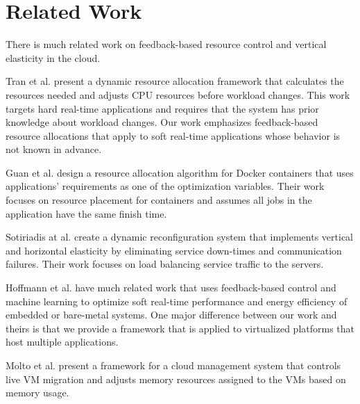 \section{Related Work}
\label{sr}

There is much related work on feedback-based resource control and vertical elasticity in the cloud.

Tran et al. \cite{dartc} present a dynamic resource allocation framework that calculates the resources needed and adjusts CPU resources before workload changes. This work targets hard real-time applications and requires that the system has prior knowledge about workload changes. Our work emphasizes feedback-based resource allocations that apply to soft real-time applications whose behavior is not known in advance.

Guan et al. \cite{dockerwork} design a resource allocation algorithm for Docker containers that uses applications' requirements as one of the optimization variables. Their work focuses on resource placement for containers and assumes all jobs in the application have the same finish time. 

Sotiriadis at al. \cite{loadbalancer} create a dynamic reconfiguration system that implements vertical and horizontal elasticity by eliminating service down-times and communication failures. Their work focuses on load balancing service traffic to the servers. 


Hoffmann et al. have much related work\cite{poet}\cite{bard}\cite{poet2}\cite{calo} that uses feedback-based control and machine learning to optimize soft real-time performance and energy efficiency of embedded or bare-metal systems. One major difference between our work and theirs is that we provide a framework that is applied to virtualized platforms that host multiple applications.

Molto et al. \cite{mem} present a framework for a cloud management system that controls live VM migration and adjusts memory resources assigned to the VMs based on memory usage.








